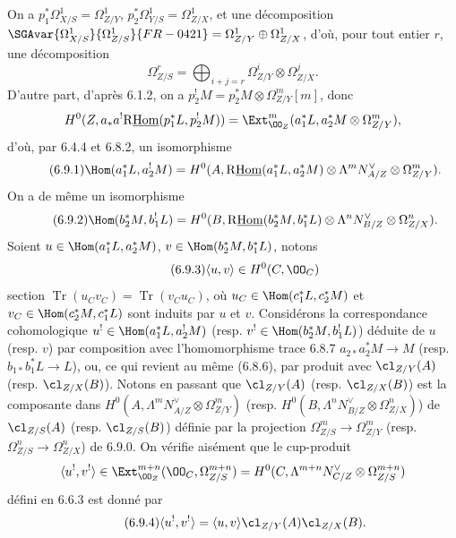 On a $p_1^*\Omega^1_{X/S}=\Omega^1_{Z/Y}$, $p_2^*\Omega^1_{Y/S}=\Omega^1_{Z/X}$, et une décomposition $\SGAvar{\Omega^1_{X/S}}{\Omega^1_{Z/S}}{FR-0421}=\Omega^1_{Z/Y}\oplus\Omega^1_{Z/X}$, d'où, pour tout entier $r$, une décomposition
\begin{equation}
\tag{6.9.0}
\Omega^r_{Z/S}=\bigoplus_{i+j=r}\Omega^i_{Z/Y}\otimes\Omega^j_{Z/X}.
\end{equation}
D'autre part, d'après 6.1.2, on a $p_2^!M=p_2^*M\otimes\Omega^m_{Z/Y}[m]$, donc
\[
H^0(Z,a_*a^!\mathrm{R}\underline{\mathrm{Hom}}(p_1^*L,p_2^!M))=\Ext^m_{\OO_Z}(a_1^*L,a_2^*M\otimes\Omega^m_{Z/Y}),
\]
d'où, par 6.4.4 et 6.8.2, un isomorphisme
\begin{equation}
\tag{6.9.1}
\Hom(a_1^*L,a_2^!M)=H^0(A,\mathrm{R}\underline{\mathrm{Hom}}(a_1^*L,a_2^*M)\otimes\Lambda^m N_{A/Z}^{\vee}\otimes\Omega^m_{Z/Y}).
\end{equation}
On a de même un isomorphisme
\begin{equation}
\tag{6.9.2}
\Hom(b_2^*M,b_1^!L)=H^0(B,\mathrm{R}\underline{\mathrm{Hom}}(b_2^*M,b_1^*L)\otimes\Lambda^n N_{B/Z}^{\vee}\otimes\Omega^n_{Z/X}).
\end{equation}
Soient $u\in\Hom(a_1^*L,a_2^*M)$, $v\in\Hom(b_2^*M,b_1^*L)$, notons
\begin{equation}
\tag{6.9.3}
\langle u,v\rangle\in H^0(C,\OO_C)
\end{equation}
section $\operatorname{Tr}(u_Cv_C)=\operatorname{Tr}(v_Cu_C)$, où $u_C\in\Hom(c_1^*L,c_2^*M)$ et $v_C\in\Hom(c_2^*M,c_1^*L)$ sont induits par $u$ et $v$. Considérons la correspondance cohomologique $u^!\in\Hom(a_1^*L,a_2^!M)$ (resp. $v^!\in\Hom(b_2^*M,b_1^!L)$) déduite de $u$ (resp. $v$) par composition avec l'homomorphisme trace 6.8.7 $a_{2*}a_2^*M\to M$ (resp. $b_{1*}b_1^*L\to L$), ou, ce qui revient au même (6.8.6), par produit avec $\cl_{Z/Y}(A)$ (resp. $\cl_{Z/X}(B)$). Notons en passant que $\cl_{Z/Y}(A)$ (resp. $\cl_{Z/X}(B)$) est la composante dans $H^0(A,\Lambda^mN_{A/Z}^{\vee}\otimes\Omega^m_{Z/Y})$ (resp. $H^0(B,\Lambda^nN_{B/Z}^{\vee}\otimes\Omega^n_{Z/X})$) de $\cl_{Z/S}(A)$ (resp. $\cl_{Z/S}(B)$) définie par la projection $\Omega^m_{Z/S}\to\Omega^m_{Z/Y}$ (resp. $\Omega^n_{Z/S}\to\Omega^n_{Z/X}$) de 6.9.0. On vérifie aisément que le cup-produit
\[
\langle u^!,v^!\rangle\in\Ext^{m+n}_{\OO_Z}(\OO_C,\Omega^{m+n}_{Z/S})=H^0(C,\Lambda^{m+n}N_{C/Z}^{\vee}\otimes\Omega^{m+n}_{Z/S})
\]
défini en 6.6.3 est donné par
\begin{equation}
\tag{6.9.4}
\langle u^!,v^!\rangle=\langle u,v\rangle\cl_{Z/Y}(A)\cl_{Z/X}(B).
\end{equation}
